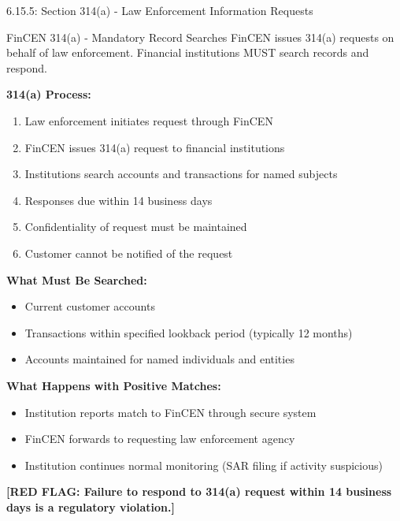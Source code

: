 \documentclass[11pt,a4paper]{beamer}
\newcommand{\redflag}[1]{\textcolor{red!80!black}{\textbf{[RED FLAG: #1]}}}
\begin{document}
\begin{frame}{6.15.5: Section 314(a) - Law Enforcement Information Requests}
	\begin{block}{FinCEN 314(a) - Mandatory Record Searches}
		FinCEN issues 314(a) requests on behalf of law enforcement. Financial institutions MUST search records and respond.
	\end{block}
	\textbf{314(a) Process:}
	\begin{enumerate}
		\item Law enforcement initiates request through FinCEN
		\item FinCEN issues 314(a) request to financial institutions
		\item Institutions search accounts and transactions for named subjects
		\item Responses due within 14 business days
		\item Confidentiality of request must be maintained
		\item Customer cannot be notified of the request
	\end{enumerate}
	\textbf{What Must Be Searched:}
	\begin{itemize}
		\item Current customer accounts
		\item Transactions within specified lookback period (typically 12 months)
		\item Accounts maintained for named individuals and entities
	\end{itemize}
	\textbf{What Happens with Positive Matches:}
	\begin{itemize}
		\item Institution reports match to FinCEN through secure system
		\item FinCEN forwards to requesting law enforcement agency
		\item Institution continues normal monitoring (SAR filing if activity suspicious)
	\end{itemize}
	\redflag{Failure to respond to 314(a) request within 14 business days is a regulatory violation.}
\end{frame}
\end{document}
